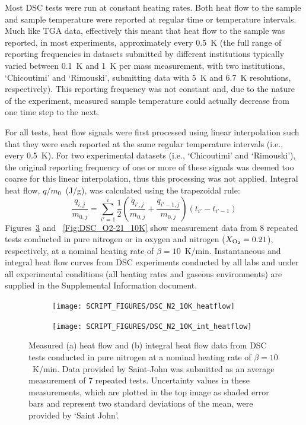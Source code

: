 \documentclass{book}
\begin{document}
Most DSC tests were run at constant heating rates. Both heat flow to the sample and sample temperature were reported at regular time or temperature intervals. Much like TGA data, effectively this meant that heat flow to the sample was reported, in most experiments, approximately every 0.5~K (the full range of reporting frequencies in datasets submitted by different institutions typically varied between 0.1~K and 1~K per mass measurement, with two institutions, ‘Chicoutimi’ and ‘Rimouski’, submitting data with 5~K and 6.7~K resolutions, respectively). This reporting frequency was not constant and, due to the nature of the experiment, measured sample temperature could actually decrease from one time step to the next.

For all tests, heat flow signals were first processed using linear interpolation such that they were each reported at the same regular temperature intervals (i.e., every 0.5~K). For two experimental datasets (i.e., ‘Chicoutimi’ and ‘Rimouski’), the original reporting frequency of one or more of these signals was deemed too coarse for this linear interpolation, thus this processing was not applied. Integral heat flow, $q/m_0$~(J/g), was calculated using the trapezoidal rule:
\begin{equation}
\frac{q_{i,j}}{m_{0,j}} = \sum_{i'=1}^i \frac{1}{2} \left( \frac{\dot{q}_{i',j}}{m_{0,j}} + \frac{\dot{q}_{i'-1,j}}{m_{0,j}} \right) \left(t_{i'}-t_{i'-1} \right)
\end{equation}
Figures~\ref{Fig:DSC_N2_10K} and ~\ref{Fig:DSC_O2-21_10K} show measurement data from 8 repeated tests conducted in pure nitrogen or in oxygen and nitrogen ($X_{\rm O_2}=0.21$), respectively, at a nominal heating rate of $\beta=10$~K/min. Instantaneous and integral heat flow curves from DSC experiments conducted by all labs and under all experimental conditions (all heating rates and gaseous environments) are supplied in the Supplemental Information document.

\begin{figure} [p]
\centering
\begin{subfigure}[b]{0.85\textwidth}
   \texttt{[image: SCRIPT\_FIGURES/DSC\_N2\_10K\_heatflow]}
   \caption{}
   \label{Fig:DSC_N2_10K_heatflow}
\end{subfigure}

\begin{subfigure}[b]{0.85\textwidth}
   \texttt{[image: SCRIPT\_FIGURES/DSC\_N2\_10K\_int\_heatflow]}
   \caption{}
   \label{Fig:DSC_N2_10K_int_heatflow}
\end{subfigure}

  \caption{Measured (a) heat flow and (b) integral heat flow data from DSC tests conducted in pure nitrogen at a nominal heating rate of $\beta=10$~K/min. Data provided by Saint-John was submitted as an average measurement of 7 repeated tests. Uncertainty values in these measurements, which are plotted in the top image as shaded error bars and represent two standard deviations of the mean, were provided by ‘Saint John’.}
  \label{Fig:DSC_N2_10K}
\end{figure}
\end{document}
